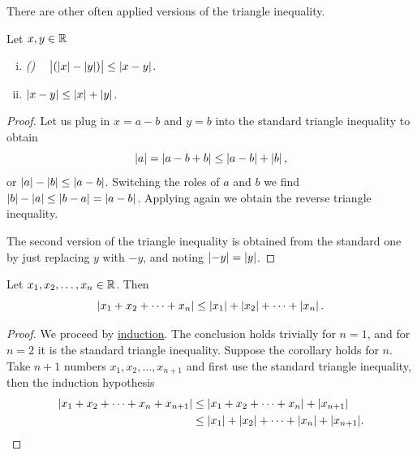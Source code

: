 There are other often applied versions of the triangle inequality.

\begin{cor}
Let $x,y \in {\mathbb{R}}$
\begin{enumerate}[(i)]
\item \emph{()}
~
$\bigl\lvert (\left\lvert {x} \right\rvert-\left\lvert {y} \right\rvert) \bigr\rvert \leq \left\lvert {x-y} \right\rvert$.
\item $\left\lvert {x-y} \right\rvert \leq \left\lvert {x} \right\rvert+\left\lvert {y} \right\rvert$.
\end{enumerate}
\end{cor}

\begin{proof}
Let us plug in $x=a-b$ and $y=b$ into the standard
triangle inequality to obtain
\begin{equation*}
\left\lvert {a} \right\rvert = \left\lvert {a-b+b} \right\rvert \leq \left\lvert {a-b} \right\rvert + \left\lvert {b} \right\rvert ,
\end{equation*}
or $\left\lvert {a} \right\rvert-\left\lvert {b} \right\rvert \leq \left\lvert {a-b} \right\rvert$.  Switching the roles of $a$ and $b$
we find 
$\left\lvert {b} \right\rvert-\left\lvert {a} \right\rvert \leq \left\lvert {b-a} \right\rvert = \left\lvert {a-b} \right\rvert$.  Applying
 again we obtain the reverse triangle
inequality.

The second version of the triangle inequality is obtained from the standard
one by just replacing $y$ with $-y$, and noting $\left\lvert {-y} \right\rvert =
\left\lvert {y} \right\rvert$.
\end{proof}

\begin{cor}
Let $x_1, x_2, \ldots, x_n \in {\mathbb{R}}$.  Then
\begin{equation*}
\left\lvert {x_1 + x_2 + \cdots + x_n} \right\rvert \leq 
\left\lvert {x_1} \right\rvert + \left\lvert {x_2} \right\rvert + \cdots + \left\lvert {x_n} \right\rvert .
\end{equation*}
\end{cor}

\begin{proof}
We proceed by \hyperref[induction:thm]{induction}.
The conclusion holds trivially for $n=1$, and
for $n=2$ it is the standard triangle inequality.  Suppose the corollary
holds for $n$.  Take $n+1$ numbers $x_1,x_2,\ldots,x_{n+1}$ and 
first use the standard triangle inequality, then the induction
hypothesis
\begin{equation*}
\begin{split}
\lvert {x_1 + x_2 + \cdots + x_n + x_{n+1}} \rvert & \leq 
\lvert {x_1 + x_2 + \cdots + x_n} \rvert + \lvert {x_{n+1}} \rvert \\
& \leq 
\lvert {x_1} \rvert + \lvert {x_2} \rvert + \cdots + \lvert {x_n} \rvert + \lvert {x_{n+1}} \rvert .  \qedhere
\end{split}
\end{equation*}
\end{proof}

